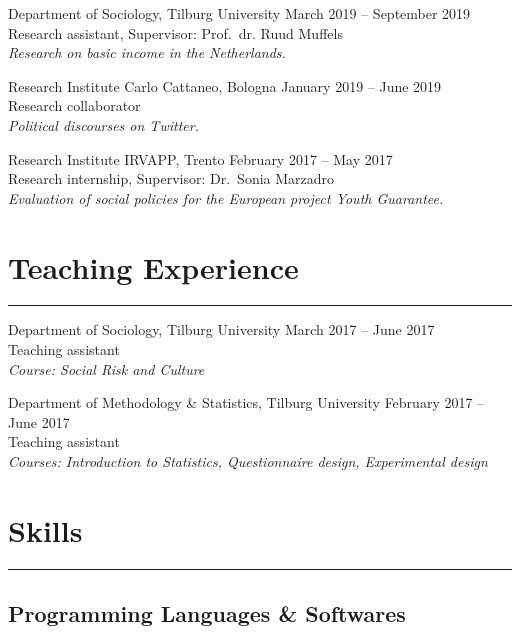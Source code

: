 \documentclass[12pt,]{article}
\begin{document}
Department of Sociology, Tilburg University
\hfill \begingroup\small March 2019 – September 2019\endgroup\\
Research assistant, Supervisor: Prof.~dr. Ruud Muffels\\
\emph{Research on basic income in the Netherlands.}

Research Institute Carlo Cattaneo, Bologna
\hfill \begingroup\small January 2019 – June 2019\endgroup\\
Research collaborator\\
\emph{Political discourses on Twitter.}

Research Institute IRVAPP, Trento
\hfill \begingroup\small February 2017 – May 2017\endgroup\\
Research internship, Supervisor: Dr.~Sonia Marzadro\\
\emph{Evaluation of social policies for the European project Youth
Guarantee.}

\hypertarget{teaching-experience}{%
\section{Teaching Experience}\label{teaching-experience}}

\vspace{-10pt}
\rule{1\linewidth}{\linethickness}

Department of Sociology, Tilburg University
\hfill \begingroup\small March 2017 – June 2017\endgroup\\
Teaching assistant\\
\emph{Course: Social Risk and Culture}

Department of Methodology \& Statistics, Tilburg University
\hfill \begingroup\small February 2017 – June 2017\endgroup\\
Teaching assistant\\
\emph{Courses: Introduction to Statistics, Questionnaire design,
Experimental design}

\hypertarget{skills}{%
\section{Skills}\label{skills}}

\vspace{-10pt}
\rule{1\linewidth}{\linethickness}

\hypertarget{programming-languages-softwares}{%
\subsection{Programming Languages \&
Softwares}\label{programming-languages-softwares}}
\end{document}
